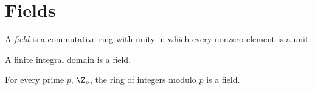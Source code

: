 \section{Fields}

\begin{definition}[Field]
	A \textit{field} is a commutative ring with unity in which every nonzero element is a unit.
\end{definition}

\begin{theorem}
	A finite integral domain is a field.
\end{theorem}

\begin{corollary}
	For every prime $p$, $\Z_p$, the ring of integers modulo $p$ is a field.
\end{corollary}
